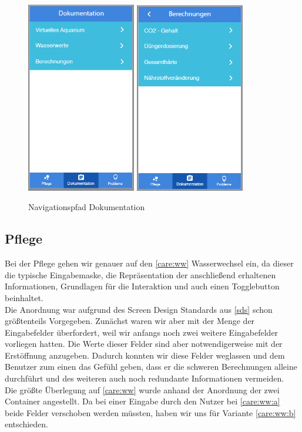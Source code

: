 \begin{figure}
	\centering
	\includegraphics[width=180px,height=\textheight,
keepaspectratio]{nav_doku}
	\includegraphics[width=180px,height=\textheight,
keepaspectratio]{nav_doku_Berechnungen}
	\caption{Navigationspfad Dokumentation}
	\label{nav:doku}
\end{figure}



\subsection{Pflege}
Bei der Pflege gehen wir genauer auf den \ref{care:ww} Wasserwechsel ein, da dieser die typische Eingabemaske, die Repräsentation der anschließend erhaltenen Informationen, Grundlagen für die Interaktion und auch einen Togglebutton beinhaltet. 
\\
Die Anordnung war aufgrund des Screen Design Standards aus \ref{sds} schon größtenteils Vorgegeben. Zunächst waren wir aber mit der Menge der Eingabefelder überfordert, weil wir anfangs noch zwei weitere Eingabefelder vorliegen hatten. Die Werte dieser Felder sind aber notwendigerweise mit der Erstöffnung anzugeben. Dadurch konnten wir diese Felder weglassen und dem Benutzer zum einen das Gefühl geben, dass er die schweren Berechnungen alleine durchführt und des weiteren auch noch redundante Informationen vermeiden. \\
Die größte Überlegung auf \ref{care:ww} wurde anhand der Anordnung der zwei Container angestellt. Da bei einer Eingabe durch den Nutzer bei \ref{care:ww:a} beide Felder verschoben werden müssten, haben wir uns für Variante \ref{care:ww:b} entschieden. 

